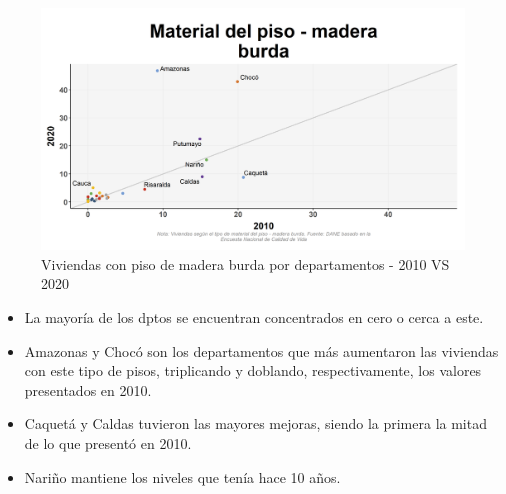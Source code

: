     \begin{figure}[H]
        \caption{Viviendas con piso de madera burda por departamentos - 2010 VS 2020 \label{map_result_2} }
        \begin{center}
        \includegraphics[width=\textwidth,keepaspectratio]{img/var_175_scatter_time.png}
        \end{center}
    \end{figure}
            \begin{itemize}
                    \item La mayoría de los dptos se encuentran concentrados en cero o cerca a este.
                    \item Amazonas y Chocó son los departamentos que más aumentaron las viviendas con este tipo de pisos, triplicando y doblando, respectivamente, los valores presentados en 2010.
                    \item Caquetá y Caldas tuvieron las mayores mejoras, siendo la primera la mitad de lo que presentó en 2010.
                    \item Nariño mantiene los niveles que tenía hace 10 años.
                    \end{itemize}

